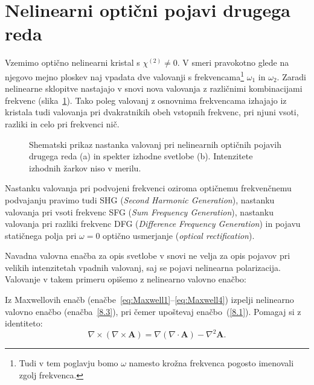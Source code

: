 \section{Nelinearni optični pojavi drugega reda}
Vzemimo optično nelinearni kristal s $\chi^{(2)} \neq 0$. V smeri pravokotno 
glede na njegovo mejno ploskev naj vpadata dve valovanji s frekvencama\footnote{Tudi 
v tem poglavju bomo $\omega$ namesto krožna frekvenca pogosto imenovali zgolj frekvenca.}
$\omega_{1}$ in $\omega_{2}$. Zaradi nelinearne sklopitve nastajajo v snovi nova 
valovanja z različnimi kombinacijami frekvenc (slika~\ref{fig:nl2}).
Tako poleg valovanj z osnovnima frekvencama izhajajo iz kristala tudi 
valovanja pri dvakratnikih obeh vstopnih frekvenc, pri njuni vsoti, 
razliki in celo pri frekvenci nič. 

\begin{figure}[ht]
\centering
\def\svgwidth{128truemm} 

\caption{Shematski prikaz nastanka valovanj pri nelinearnih optičnih pojavih drugega reda (a)
in spekter izhodne svetlobe (b). Intenzitete izhodnih žarkov niso v merilu.}
\label{fig:nl2}
\end{figure}

\begin{remark}
Nastanku valovanja pri podvojeni frekvenci oziroma optičnemu frekvenčnemu podvajanju pravimo tudi
SHG ({\it Second Harmonic 
Generation}), 
nastanku valovanja pri vsoti frekvenc SFG
({\it Sum Frequency Generation}), 
nastanku valovanja pri razliki frekvenc DFG 
({\it Difference Frequency Generation}) in pojavu 
statičnega polja pri $\omega = 0$ optično usmerjanje
({\it optical rectification}).  
\end{remark}

Navadna valovna enačba za opis svetlobe v snovi  
ne velja za opis pojavov pri velikih 
intenzitetah vpadnih valovanj, saj se pojavi nelinearna polarizacija. Valovanje 
v takem primeru opišemo z nelinearno valovno 
enačbo:

\begin{naloga}
Iz Maxwellovih enačb (enačbe~\ref{eq:Maxwell1}--\ref{eq:Maxwell4}) izpelji 
nelinearno valovno enačbo (enačba~\ref{8.3}), pri čemer upoštevaj enačbo~(\ref{8.1}). 
Pomagaj si z identiteto:
\begin{equation}
\nabla \times (\nabla \times \mathbf{A}) = \nabla (\nabla \cdot \mathbf{A}) 
- \nabla^2 \mathbf{A}.
\end{equation}
\end{naloga} 

